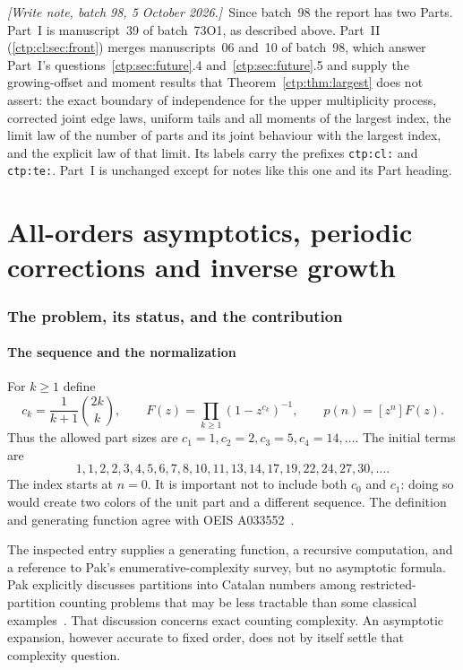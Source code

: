 \documentclass[11pt,a4paper]{article}
\numberwithin{equation}{section}
\theoremstyle{definition}
\theoremstyle{remark}
\newcommand{\writenoteB}[1]{\par\smallskip\noindent
 \textit{[Write note, batch 98, 5 October 2026.]}\ #1\par\smallskip}
\begin{document}
\writenoteB{Since batch~98 the report has two Parts. Part~I is
manuscript~39 of batch~73O1, as described above. Part~II
(\cref{ctp:cl:sec:front}) merges manuscripts~06 and~10 of batch~98, which
answer Part~I's questions~\ref{ctp:sec:future}.4 and~\ref{ctp:sec:future}.5
and supply the growing-offset and moment results that
Theorem~\ref{ctp:thm:largest} does not assert: the exact boundary of
independence for the upper multiplicity process, corrected joint edge laws,
uniform tails and all moments of the largest index, the limit law of the
number of parts and its joint behaviour with the largest index, and the
explicit law of that limit. Its labels carry the prefixes \texttt{ctp:cl:}
and \texttt{ctp:te:}. Part~I is unchanged except for notes like this one and its Part heading.}

\clearpage
{\small\setlength{\parskip}{0pt}\tableofcontents}
\clearpage

\part{All-orders asymptotics, periodic corrections and inverse growth}

\section{The problem, its status, and the contribution}
\label{ctp:sec:intro}

\subsection{The sequence and the normalization}
For $k\geq1$ define
\begin{equation}\label{ctp:eq:catalan}
 c_k=\frac1{k+1}\binom{2k}{k},\qquad
 F(z)=\prod_{k\geq1}(1-z^{c_k})^{-1},\qquad
 p(n)=[z^n]F(z).
\end{equation}
Thus the allowed part sizes are $c_1=1,c_2=2,c_3=5,c_4=14,\ldots$.
The initial terms are
\[
 1,1,2,2,3,4,5,6,7,8,10,11,13,14,17,19,22,24,27,30,\ldots.
\]
The index starts at $n=0$. It is important not to include both $c_0$ and
$c_1$: doing so would create two colors of the unit part and a different
sequence. The definition and generating function agree with OEIS
A033552~\cite{oeis}.

The inspected entry supplies a generating function, a recursive computation,
and a reference to Pak's enumerative-complexity survey, but no asymptotic
formula. Pak explicitly discusses partitions into Catalan numbers among
restricted-partition counting problems that may be less tractable than some
classical examples~\cite[\S2.5]{pak}. That discussion concerns exact counting
complexity. An asymptotic expansion, however accurate to fixed order, does
not by itself settle that complexity question.
\end{document}
